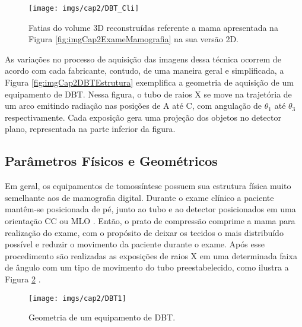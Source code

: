 \begin{figure}[H]
	\caption{Fatias do volume \acs{3D} reconstruídas referente a mama apresentada na Figura \ref{fig:imgCap2ExameMamografia} na sua versão \acs{2D}.}
	\begin{center}
		\texttt{[image: imgs/cap2/DBT\_Cli]}
	\end{center}
	\label{fig:imgCap2ExameDBT}
\end{figure}

As variações no processo de aquisição das imagens dessa técnica ocorrem de acordo com cada fabricante, contudo, de uma maneira geral e simplificada, a Figura \ref{fig:imgCap2DBTEstrutura} exemplifica a geometria de aquisição de um equipamento de \acs{DBT}. Nessa figura, o tubo de raios X se move na trajetória de um arco emitindo radiação nas posições de A até C, com angulação de $\theta_{1}$ até $\theta_{3}$ respectivamente. Cada exposição gera uma projeção dos objetos no detector plano, representada na parte inferior da figura.

\subsection{Parâmetros Físicos e Geométricos}\label{ParâmetrosFísicoseGeométricos}

Em geral, os equipamentos de tomossíntese possuem sua estrutura física muito semelhante aos de  mamografia digital. Durante o exame clínico a paciente mantêm-se posicionada de pé, junto ao tubo e ao detector posicionados em uma orientação \ac{CC} ou \ac{MLO} \cite{Niklason20185}. Então, o prato de compressão comprime a mama para realização do exame, com o propósito de deixar os tecidos o mais distribuído possível e reduzir o movimento da paciente durante o exame. Após esse procedimento são realizadas as exposições de raios X em uma determinada faixa de ângulo com um tipo de movimento do tubo preestabelecido, como ilustra a Figura \ref{fig:imgCap2DBTEstrutura1} \cite{baker2011breast}.  

\begin{figure}[H]
	\caption{Geometria de um equipamento de \acs{DBT}.}
	\begin{center}
		\texttt{[image: imgs/cap2/DBT1]}
	\end{center}
	\label{fig:imgCap2DBTEstrutura1}
\end{figure}

